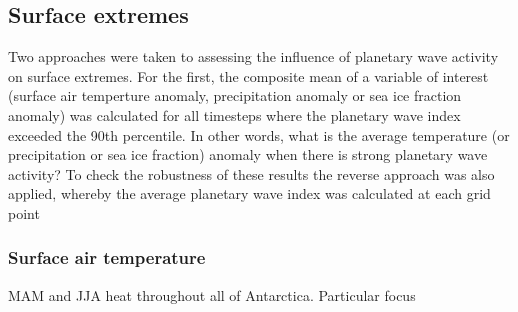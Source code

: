 \subsection{Surface extremes}

Two approaches were taken to assessing the influence of planetary wave activity on surface extremes. For the first, the composite mean of a variable of interest (surface air temperture anomaly, precipitation anomaly or sea ice fraction anomaly) was calculated for all timesteps where the planetary wave index exceeded the 90th percentile. In other words, what is the average temperature (or precipitation or sea ice fraction) anomaly when there is strong planetary wave activity? To check the robustness of these results the reverse approach was also applied, whereby the average planetary wave index was calculated at each grid point  

\subsubsection{Surface air temperature}

MAM and JJA heat throughout all of Antarctica. Particular focus 

